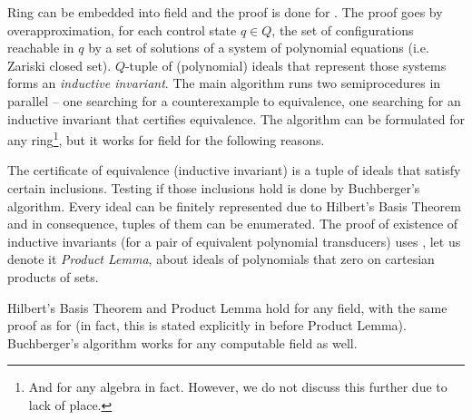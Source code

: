Ring \Z can be embedded into field \Q and the proof is done for \polTsover{\Q}.
The proof goes by overapproximation, for each control state $q \in Q$, the set of configurations reachable in $q$ by a set of solutions of a system of polynomial equations (i.e. Zariski closed set).
$Q$-tuple of (polynomial) ideals that represent those systems forms an \emph{inductive invariant}.
The main algorithm runs two semiprocedures in parallel -- one searching for a counterexample to equivalence, one searching for an inductive invariant that certifies equivalence. The algorithm can be formulated for any ring\footnote{And for any algebra in fact. However, we do not discuss this further due to lack of place.}, but it works for field \Q for the following reasons.

The certificate of equivalence (inductive invariant) is a tuple of ideals that satisfy certain inclusions. Testing if those inclusions hold is done by Buchberger's algorithm. Every ideal can be finitely represented due to Hilbert's Basis Theorem and in consequence, tuples of them can be enumerated.
The proof of existence of inductive invariants (for a pair of equivalent polynomial transducers) uses \cite[Lemma 6.3]{seidlManethKemper2018}, let us denote it \emph{Product Lemma}, about ideals of polynomials that zero on cartesian products of sets.

 Hilbert's Basis Theorem and Product Lemma hold for any field, with the same proof as for \Q (in fact, this is stated explicitly in \cite{seidlManethKemper2018} before Product Lemma). Buchberger's algorithm works for any computable field as well.

